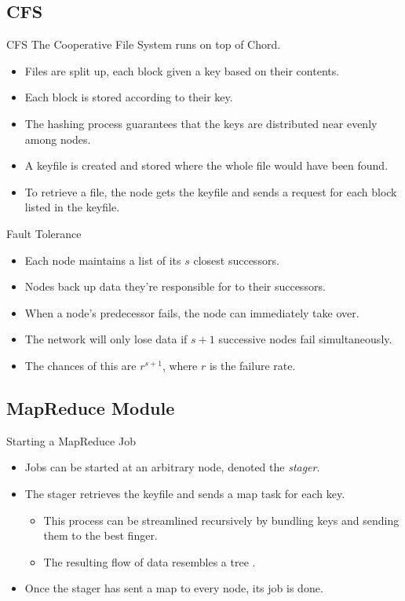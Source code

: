 \documentclass[11pt]{beamer}
\begin{document}
\subsection{CFS}
\begin{frame}{CFS}
The Cooperative File System runs on top of Chord.

\begin{itemize}
	\item Files are split up, each block given a key based on their contents.
	\item Each block is stored according to their key.
	\item The hashing process guarantees that the keys are distributed near evenly among nodes.
	\item A keyfile is created and stored where the whole file would have been found.
	\item To retrieve a file, the node gets the keyfile and sends a request for each block listed in the keyfile.
\end{itemize}
\end{frame}
\begin{frame}{Fault Tolerance}

\begin{itemize}
	\item Each node maintains a list of its $s$ closest successors.
	\item Nodes back up data they're responsible for to their successors.
	\item When a node's predecessor fails, the node can immediately take over.
	\item The network will only lose data if $s+1$ successive nodes fail simultaneously.
	\item The chances of this are $r^{s+1}$, where $r$ is the failure rate.
\end{itemize}

\end{frame}






\subsection{MapReduce Module}

\begin{frame}{Starting a MapReduce Job}
\begin{itemize}
	\item Jobs can be started at an arbitrary node, denoted the \emph{stager}.
	\item The stager retrieves the keyfile and sends a map task for each key.
	\begin{itemize}
		\item This process can be streamlined recursively by bundling keys and sending them to the best finger.
		\item The resulting flow of data resembles a tree \cite{leemap}.
	\end{itemize}
	\item Once the stager has sent a map to every node, its job is done.
\end{itemize}
\end{frame}
\end{document}
